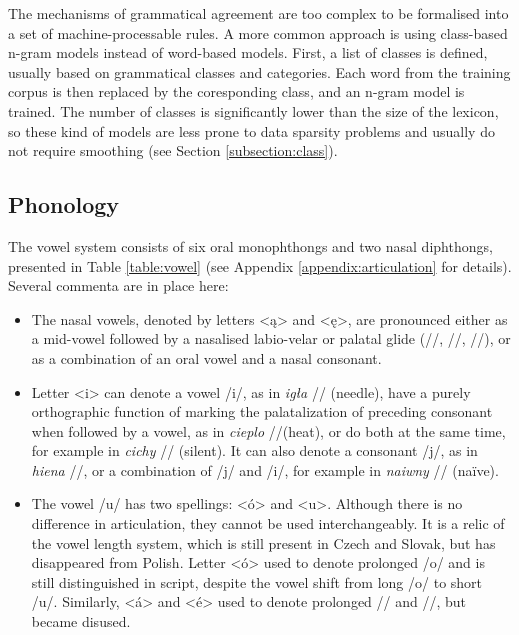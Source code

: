 The mechanisms of grammatical agreement are too complex to be formalised into a set of machine-processable rules. A more common approach is using class-based n-gram models instead of word-based models. First, a list of classes is defined, usually based on grammatical classes and categories. Each word from the training corpus is then replaced by the coresponding class, and an n-gram model is trained. The number of classes is significantly lower than the size of the lexicon, so these kind of models are less prone to data sparsity problems and usually do not require smoothing (see Section \ref{subsection:class}).

\subsection{Phonology}
The vowel system consists of six oral monophthongs and two nasal diphthongs, presented in Table \ref{table:vowel} (see Appendix \ref{appendix:articulation} for details). Several commenta are in place here:
\begin{itemize}
\item The nasal vowels, denoted by letters <ą> and <ę>, are pronounced either as a mid-vowel followed by a nasalised labio-velar or palatal glide (//, //, //), or as a combination of an oral vowel and a nasal consonant.
\item Letter <i> can denote a vowel /i/, as in \textit{igła} // (needle), have a purely orthographic function of marking the palatalization of preceding consonant when followed by a vowel, as in \textit{cieplo} //(heat), or do both at the same time, for example in \textit{cichy} // (silent). It can also denote a consonant /j/, as in \textit{hiena} //, or a combination of /j/ and /i/, for example in \textit{naiwny} // (naïve).
\item The vowel /u/ has two spellings: <ó> and <u>. Although there is no difference in articulation, they cannot be used interchangeably. It is a relic of the vowel length system, which is still present in Czech and Slovak, but has disappeared from Polish. Letter <ó> used to denote prolonged /o/ and is still distinguished in script, despite the vowel shift from long /o/ to short /u/. Similarly, <á> and <é> used to denote prolonged // and //, but became disused.
\end{itemize}

